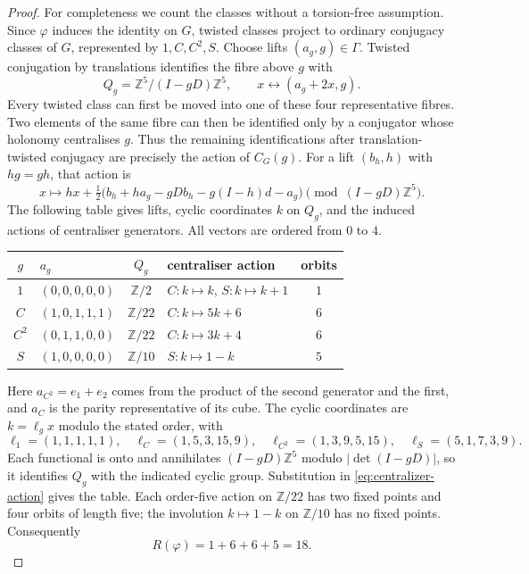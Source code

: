 \documentclass[11pt]{article}
\theoremstyle{definition}
\newcommand{\Z}{\mathbb{Z}}
\begin{document}
\begin{proof}
For completeness we count the classes without a torsion-free assumption. Since $\varphi$ induces the identity
on $G$, twisted classes project to ordinary conjugacy classes of $G$, represented by $1,C,C^2,S$.
Choose lifts $(a_g,g)\in\Gamma$. Twisted conjugation by translations identifies the fibre above $g$ with
\[
 Q_g=\Z^5/(I-gD)\Z^5,
 \qquad x\longleftrightarrow(a_g+2x,g).
\]
Every twisted class can first be moved into one of these four representative fibres.
Two elements of the same fibre can then be identified only by a conjugator whose holonomy centralises $g$.
Thus the remaining identifications after translation-twisted conjugacy are precisely the action of $C_G(g)$.
For a lift $(b_h,h)$ with $hg=gh$, that action is
\begin{equation}\label{eq:centralizer-action}
 x\longmapsto h x+\tfrac12\bigl(b_h+h a_g-gDb_h-g(I-h)d-a_g\bigr)
 \pmod{(I-gD)\Z^5}.
\end{equation}
The following table gives lifts, cyclic coordinates $k$ on $Q_g$, and the induced actions of centraliser
generators. All vectors are ordered from $0$ to $4$.
\begin{center}\small
\begin{tabular}{clclc}
\toprule
$g$ & $a_g$ & $Q_g$ & centraliser action & orbits\\
\midrule
$1$ & $(0,0,0,0,0)$ & $\Z/2$ & $C:k\mapsto k$, $S:k\mapsto k+1$ & $1$\\
$C$ & $(1,0,1,1,1)$ & $\Z/22$ & $C:k\mapsto5k+6$ & $6$\\
$C^2$ & $(0,1,1,0,0)$ & $\Z/22$ & $C:k\mapsto3k+4$ & $6$\\
$S$ & $(1,0,0,0,0)$ & $\Z/10$ & $S:k\mapsto1-k$ & $5$\\
\bottomrule
\end{tabular}
\end{center}
Here $a_{C^2}=e_1+e_2$ comes from the product of the second generator and the first, and $a_C$ is the parity
representative of its cube. The cyclic coordinates are $k=\ell_g x$ modulo the stated order, with
\[
 \ell_1=(1,1,1,1,1),\quad \ell_C=(1,5,3,15,9),\quad
 \ell_{C^2}=(1,3,9,5,15),\quad \ell_S=(5,1,7,3,9).
\]
Each functional is onto and annihilates $(I-gD)\Z^5$ modulo $|\det(I-gD)|$, so it identifies $Q_g$ with the
indicated cyclic group. Substitution in \eqref{eq:centralizer-action} gives the table.
Each order-five action on $\Z/22$ has two fixed points and four orbits of length five; the involution
$k\mapsto1-k$ on $\Z/10$ has no fixed points. Consequently
\[
 R(\varphi)=1+6+6+5=18.
\]
\end{proof}
\end{document}
